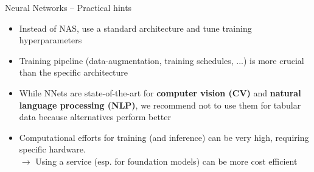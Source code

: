 \begin{frame}{Neural Networks -- Practical hints}

\begin{itemize}
    \item Instead of NAS, use a standard architecture and tune training hyperparameters
    \item Training pipeline (data-augmentation, training schedules, ...) is more crucial than the specific architecture
    \item While NNets are state-of-the-art for \textbf{computer vision (CV)} and \textbf{natural language processing (NLP)}, we recommend not to use them for tabular data because alternatives perform better
    \item Computational efforts for training (and inference) can be very high, requiring specific hardware.\\
    $\rightarrow$ Using a service (esp. for foundation models) can be more cost efficient
\end{itemize}




\end{frame}
